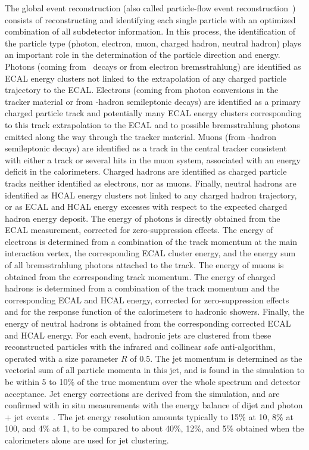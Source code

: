 The global event reconstruction (also called particle-flow event reconstruction~\cite{CMS-PAS-PFT-09-001,CMS-PAS-PFT-10-001}) consists of reconstructing and identifying each single particle with an optimized combination of all subdetector information. In this process, the identification of the particle type (photon, electron, muon, charged hadron, neutral hadron) plays an important role in the determination of the particle direction and energy. Photons (\eg coming from \Pgpz\ decays or from electron bremsstrahlung) are identified as ECAL energy clusters not linked to the extrapolation of any charged particle trajectory to the ECAL. Electrons (\eg coming from photon conversions in the tracker material or from \cPqb-hadron semileptonic decays) are identified as a primary charged particle track and potentially many ECAL energy clusters corresponding to this track extrapolation to the ECAL and to possible bremsstrahlung photons emitted along the way through the tracker material. Muons (\eg from \cPqb-hadron semileptonic decays) are identified as a track in the central tracker consistent with either a track or several hits in the muon system, associated with an energy deficit in the calorimeters. Charged hadrons are identified as charged particle tracks neither identified as electrons, nor as muons. Finally, neutral hadrons are identified as HCAL energy clusters not linked to any charged hadron trajectory, or as ECAL and HCAL energy excesses with respect to the expected charged hadron energy deposit.
The energy of photons is directly obtained from the ECAL measurement, corrected for zero-suppression effects. The energy of electrons is determined from a combination of the track momentum at the main interaction vertex, the corresponding ECAL cluster energy, and the energy sum of all bremsstrahlung photons attached to the track. The energy of muons is obtained from the corresponding track momentum. The energy of charged hadrons is determined from a combination of the track momentum and the corresponding ECAL and HCAL energy, corrected for zero-suppression effects and for the response function of the calorimeters to hadronic showers. Finally, the energy of neutral hadrons is obtained from the corresponding corrected ECAL and HCAL energy.
For each event, hadronic jets are clustered from these reconstructed particles with the infrared and collinear safe anti-\kt algorithm, operated with a size parameter $R$ of 0.5. The jet momentum is determined as the vectorial sum of all particle momenta in this jet, and is found in the simulation to be within 5 to 10\% of the true momentum over the whole \pt spectrum and detector acceptance. Jet energy corrections are derived from the simulation, and are confirmed with in situ measurements with the energy balance of dijet and photon + jet events~\cite{Chatrchyan:2011ds}. The jet energy resolution amounts typically to 15\% at 10\GeV, 8\% at 100\GeV, and 4\% at 1\TeV, to be compared to about 40\%, 12\%, and 5\% obtained when the calorimeters alone are used for jet clustering.


